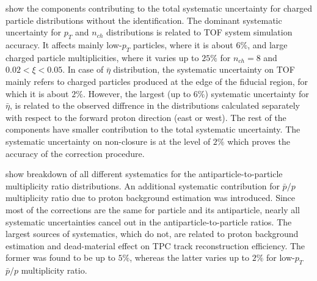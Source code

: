  show the components contributing to the total systematic uncertainty for charged particle distributions without the identification. The dominant systematic uncertainty for $p_T$ and $n_{ch}$ distributions is related to TOF system simulation accuracy. It affects mainly low-$p_T$ particles, where it is about $6\%$, and large charged particle multiplicities, where it varies up to $25\%$ for $n_{ch}=8$ and $0.02 < \xi < 0.05$. In case of $\bar{\eta}$ distribution, the systematic uncertainty on TOF mainly refers to charged particles produced at the edge of the fiducial region, for which it is about $2\%$.  However, the largest (up to $6\%$) systematic uncertainty for $\bar{\eta}$,  is related to the observed diffrence  in the distributions calculated separately with respect to the forward proton direction (east or west). The rest of the components have smaller contribution to the total systematic uncertainty. The systematic uncertainty on non-closure is at the level of $2\%$ which proves  the accuracy of the correction procedure. 

 show breakdown of all different systematics for the antiparticle-to-particle multiplicity ratio distributions. An additional systematic contribution for $\bar{p}/p$ multiplicity ratio due to proton background estimation was introduced.
Since most of the corrections are the same for particle and its antiparticle, nearly all systematic uncertainties cancel out in the antiparticle-to-particle ratios. 
The largest sources of systematics, which  do not, are related to proton background estimation and dead-material effect on TPC track reconstruction efficiency.  The former was found to be up to $5\%$, whereas the latter varies up to $2\%$ for low-$p_T$ $\bar{p}/p$ multiplicity ratio. 

